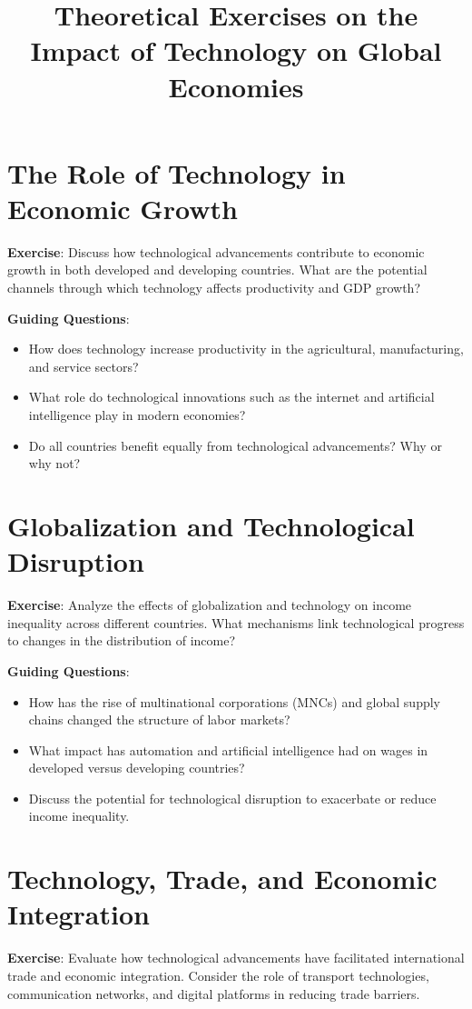 \documentclass{article}
\title{Theoretical Exercises on the Impact of Technology on Global Economies}
\author{}
\date{}
\begin{document}
\maketitle

\section{The Role of Technology in Economic Growth}
\textbf{Exercise}: Discuss how technological advancements contribute to economic growth in both developed and developing countries. What are the potential channels through which technology affects productivity and GDP growth?

\textbf{Guiding Questions}:
\begin{itemize}
    \item How does technology increase productivity in the agricultural, manufacturing, and service sectors?
    \item What role do technological innovations such as the internet and artificial intelligence play in modern economies?
    \item Do all countries benefit equally from technological advancements? Why or why not?
\end{itemize}

\section{Globalization and Technological Disruption}
\textbf{Exercise}: Analyze the effects of globalization and technology on income inequality across different countries. What mechanisms link technological progress to changes in the distribution of income?

\textbf{Guiding Questions}:
\begin{itemize}
    \item How has the rise of multinational corporations (MNCs) and global supply chains changed the structure of labor markets?
    \item What impact has automation and artificial intelligence had on wages in developed versus developing countries?
    \item Discuss the potential for technological disruption to exacerbate or reduce income inequality.
\end{itemize}

\section{Technology, Trade, and Economic Integration}
\textbf{Exercise}: Evaluate how technological advancements have facilitated international trade and economic integration. Consider the role of transport technologies, communication networks, and digital platforms in reducing trade barriers.
\end{document}
